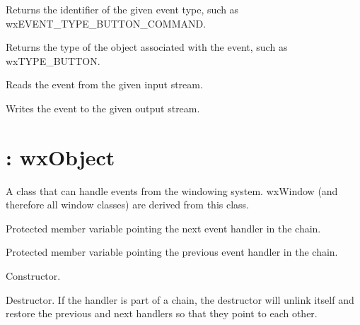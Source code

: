 

Returns the identifier of the given event type,
such as wxEVENT\_TYPE\_BUTTON\_COMMAND.



Returns the type of the object associated with the
event, such as wxTYPE\_BUTTON.



Reads the event from the given input stream.



Writes the event to the given output stream.

\section{: wxObject}\label{wxevthandler}


A class that can handle events from the windowing system.
wxWindow (and therefore all window classes) are derived from
this class.



Protected member variable pointing the next event handler in the chain.



Protected member variable pointing the previous event handler in the chain.



Constructor.



Destructor. If the handler is part of a chain, the destructor will
unlink itself and restore the previous and next handlers so that they point to
each other.

